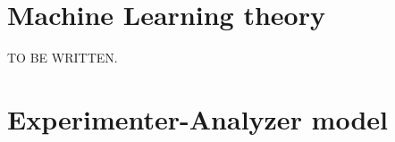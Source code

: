 \documentclass[11pt,a4paper,twoside]{report}
\newcommand{\+}{\textnormal{+} }
\theoremstyle{definition}
\newtheorem{mydef}[mythm]{Definition}
\newtheorem{myex}[mythm]{Example}
\numberwithin{equation}{chapter}
\begin{document}






\chapter{Machine Learning theory} 

TO BE WRITTEN.

\chapter{Experimenter-Analyzer model} \label{EAmodel}
\end{document}
